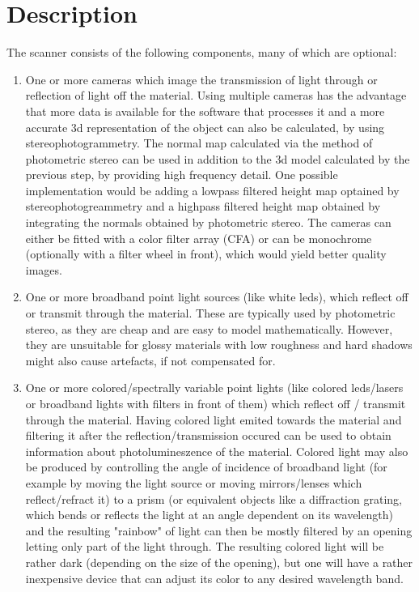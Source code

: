 \documentclass[11pt, twoside, listof=totocnumbered, bibliography=totocnumbered]{scrartcl}
\begin{document}
\section{Description}
The scanner consists of the following components, many of which are optional:
\begin{enumerate}
	\item One or more cameras which image the transmission of light through or reflection of light off the material. Using multiple cameras has the advantage that more data is available for the software that processes it and a more accurate 3d representation of the object can also be calculated, by using stereophotogrammetry. The normal map calculated via the method of photometric stereo can be used in addition to the 3d model calculated by the previous step, by providing high frequency detail. One possible implementation would be adding a lowpass filtered height map optained by stereophotogreammetry and a highpass filtered height map obtained by integrating the normals obtained by photometric stereo. The cameras can either be fitted with a color filter array (CFA) or can be monochrome (optionally with a filter wheel in front), which would yield better quality images.
	\item One or more broadband point light sources (like white leds), which reflect off or transmit through the material. These are typically used by photometric stereo, as they are cheap and are easy to model mathematically. However, they are unsuitable for glossy materials with low roughness and hard shadows might also cause artefacts, if not compensated for.
	\item One or more colored/spectrally variable point lights (like colored leds/lasers or broadband lights with filters in front of them) which reflect off / transmit through the material. Having colored light emited towards the material and filtering it after the reflection/transmission occured can be used to obtain information about photolumineszence of the material. Colored light may also be produced by controlling the angle of incidence of broadband light (for example by moving the light source or moving mirrors/lenses which reflect/refract it) to a prism (or equivalent objects like a diffraction grating, which bends or reflects the light at an angle dependent on its wavelength) and the resulting "rainbow" of light can then be mostly filtered by an opening letting only part of the light through. The resulting colored light will be rather dark (depending on the size of the opening), but one will have a rather inexpensive device that can adjust its color to any desired wavelength band.

\end{enumerate}
\end{document}
